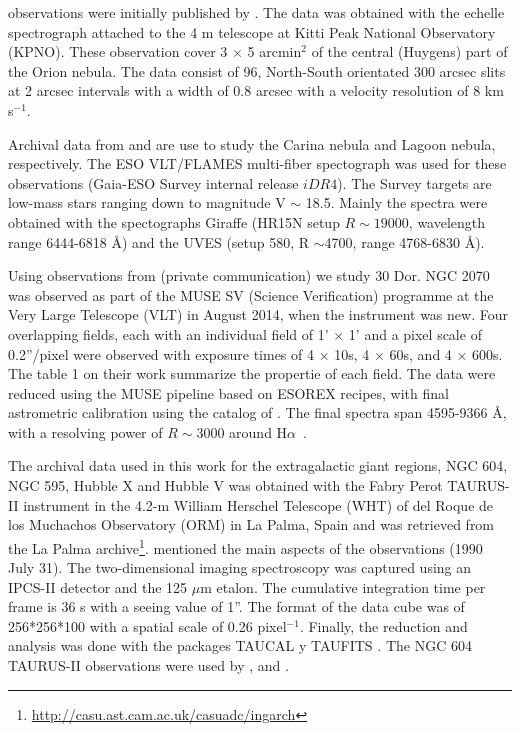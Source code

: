 \documentclass[fleqn,usenatbib, useAMS, a4paper]{mnras}
\newcommand\halpha{H${\alpha}$}
\begin{document}
\citet{arthur2016turbulence} observations were initially published by \citet{2008RMxAA..44..181G}. 
The data was obtained with the echelle spectrograph attached to the 4 m telescope at Kitti Peak National Observatory (KPNO).
These observation cover 3 \(\times\) 5 arcmin\(^{2}\) of the central (Huygens) part of the Orion nebula.
The data consist of 96, North-South orientated 300 arcsec slits at 2 arcsec intervals with a width of 0.8 arcsec with a velocity resolution of 8 km s\(^{-1}\).

Archival data from \citet{Damiani:2016a} and \citet{Damiani:2017b} are use to study the Carina nebula and Lagoon nebula, respectively. 
The ESO VLT/FLAMES multi-fiber spectograph \citep{2002Msngr.110....1P} was used for these observations (Gaia-ESO Survey internal release \(iDR4\)). 
The Survey targets are low-mass stars ranging down to magnitude V \(\sim\) 18.5.
Mainly the spectra were obtained with the spectographs Giraffe (HR15N setup \(R \sim19 000\), wavelength range 6444-6818 \AA) and the UVES (setup 580, R \(\sim\)4700, range 4768-6830 \AA).

Using observations from \citet{Castro:2018a} (private communication) we study 30 Dor.
NGC 2070 was observed as part of the MUSE SV (Science Verification) programme at the Very Large Telescope (VLT) in August 2014, when the instrument was new. 
Four overlapping fields, each with an individual field of 1' \(\times\) 1' and a pixel scale of 0.2''/pixel were observed with exposure times of 4 \(\times\) 10s, 4 \(\times\) 60s, and 4 \(\times\) 600s. 
The table 1 on their work summarize the propertie of each field.
The data were reduced using the MUSE pipeline based on ESOREX recipes, with final astrometric calibration using the catalog of \citet{1999A&A...341...98S}. 
The final spectra span 4595-9366 \AA, with a resolving power of \(R \sim3 000\) around \halpha\  \citep{Castro:2018a}.

The archival data used in this work for the extragalactic giant regions, NGC 604, NGC 595, Hubble X and Hubble V was obtained with the Fabry Perot TAURUS-II instrument in the 4.2-m William Herschel Telescope (WHT) of del Roque de los Muchachos Observatory (ORM) in La Palma, Spain and was retrieved from the La Palma archive\footnote{\url{http://casu.ast.cam.ac.uk/casuadc/ingarch}}.
\citet{sabalisck1995supersonic} mentioned the main aspects of the observations (1990 July 31).
The two-dimensional imaging spectroscopy was captured using an IPCS-II detector and the 125 $\mu$m etalon.
The cumulative integration time per frame is 36 s with a seeing value of 1''.
The format of the data cube was of 256*256*100 with a spatial scale of 0.26 pixel$^{-1}$.
Finally, the reduction and analysis was done with the packages TAUCAL y TAUFITS \citep{1992ASPC...25..445L}. The NGC 604 TAURUS-II observations were used by \citet{sabalisck1995supersonic}, \citet{tanco1997} and \citet{2019arXiv191203543M}.
\end{document}
